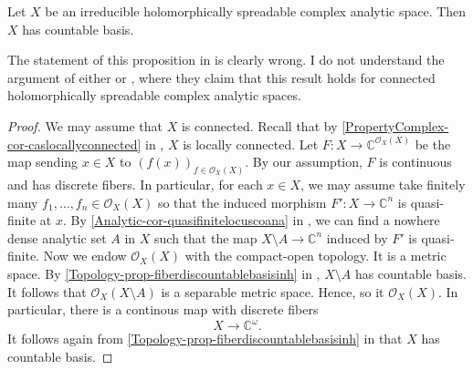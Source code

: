 \begin{proposition}
    Let $X$ be an irreducible holomorphically spreadable complex analytic space. Then $X$ has countable basis.
\end{proposition}
The statement of this proposition in \cite[Proposition~0.37]{Fis76} is clearly wrong. I do not understand the argument of either \cite{Jur59} or \cite{Gra55}, where they claim that this result holds for connected holomorphically spreadable complex analytic spaces.
\begin{proof}
    We may assume that $X$ is connected. Recall that by \cref{PropertyComplex-cor-caslocallyconnected} in , $X$ is locally connected.
    Let $F:X\rightarrow \mathbb{C}^{\mathcal{O}_X(X)}$ be the map sending $x\in X$ to $(f(x))_{f\in \mathcal{O}_X(X)}$. By our assumption, $F$ is continuous and has discrete fibers.     
    In particular, for each $x\in X$, we may assume take finitely many $f_1,\ldots,f_n\in \mathcal{O}_X(X)$ so that the induced morphism $F':X\rightarrow \mathbb{C}^n$ is quasi-finite at $x$. By \cref{Analytic-cor-quasifinitelocuscoana} in , we can find a nowhere dense analytic set $A$ in $X$ such that the map $X\setminus A\rightarrow \mathbb{C}^n$ induced by $F'$ is quasi-finite. Now we endow $\mathcal{O}_X(X)$ with the compact-open topology. It is a metric space. By \cref{Topology-prop-fiberdiscountablebasisinh} in , $X\setminus A$ has countable basis. It follows that $\mathcal{O}_X(X\setminus A)$ is a separable metric space. Hence, so it $\mathcal{O}_X(X)$. In particular, there is a continous map with discrete fibers
    \[
        X\rightarrow  \mathbb{C}^{\omega}.  
    \]
    It follows again from \cref{Topology-prop-fiberdiscountablebasisinh} in  that $X$ has countable basis.
\end{proof}

